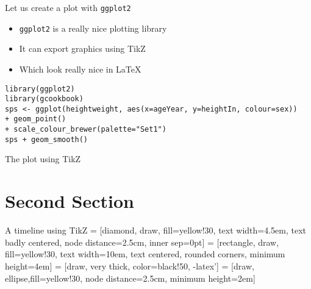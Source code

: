 \documentclass[english,presentation]{pivotalbeamer}
\begin{document}
\begin{frame}[fragile,label=sec-1-3]{Let us create a plot with \texttt{ggplot2}}
 \begin{itemize}
\item \texttt{ggplot2} is a really nice plotting library
\item It can export graphics using TikZ
\item Which look really nice in \LaTeX
\end{itemize}

\begin{verbatim}
library(ggplot2)
library(gcookbook)
sps <- ggplot(heightweight, aes(x=ageYear, y=heightIn, colour=sex))
+ geom_point()
+ scale_colour_brewer(palette="Set1")
sps + geom_smooth()
\end{verbatim}
\end{frame}

\begin{frame}[fragile,label=sec-1-4]{The plot using TikZ}
\begin{centering}
\small{}
\end{centering}
\end{frame}

\section{Second Section}
\label{sec-2}
\begin{frame}[fragile,label=sec-2-1]{A timeline using TikZ}
 = [diamond, draw, fill=yellow!30,
    text width=4.5em, text badly centered, node distance=2.5cm, inner sep=0pt]
 = [rectangle, draw, fill=yellow!30,
    text width=10em, text centered, rounded corners, minimum height=4em]
 = [draw, very thick, color=black!50, -latex']
 = [draw, ellipse,fill=yellow!30, node distance=2.5cm,
    minimum height=2em]
\end{frame}
\end{document}
